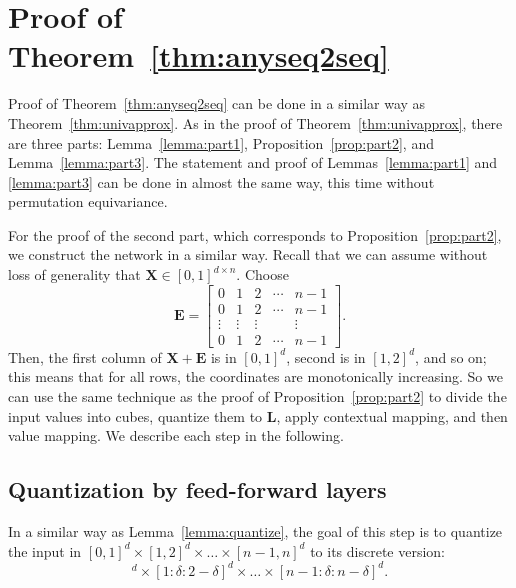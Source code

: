 \documentclass{article} %
\def\mE{{\bm{E}}}
\def\mL{{\bm{L}}}
\def\mX{{\bm{X}}}
\begin{document}

\section{Proof of Theorem~\ref{thm:anyseq2seq}}\label{sec:proof_anyseq2seq}
Proof of Theorem~\ref{thm:anyseq2seq} can be done in a similar way as Theorem~\ref{thm:univapprox}. As in the proof of Theorem~\ref{thm:univapprox}, there are three parts: Lemma~\ref{lemma:part1}, Proposition~\ref{prop:part2}, and Lemma~\ref{lemma:part3}. The statement and proof of Lemmas~\ref{lemma:part1} and \ref{lemma:part3} can be done in almost the same way, this time without permutation equivariance.

For the proof of the second part, which corresponds to Proposition~\ref{prop:part2}, we construct the network in a similar way.
Recall that we can assume without loss of generality that $\mX \in [0,1]^{d \times n}$. Choose
\begin{equation*}
    \mE = 
    \begin{bmatrix}
    0 & 1 & 2 & \cdots & n-1\\
    0 & 1 & 2 & \cdots & n-1\\
    \vdots & \vdots & \vdots & & \vdots\\
    0 & 1 & 2 & \cdots & n-1
    \end{bmatrix}.
\end{equation*}
Then, the first column of $\mX+\mE$ is in $[0,1]^d$, second is in $[1,2]^d$, and so on; this means that for all rows, the coordinates are monotonically increasing.
So we can use the same technique as the proof of Proposition~\ref{prop:part2} to divide the input values into cubes, quantize them to $\mL$, apply contextual mapping, and then value mapping. We describe each step in the following.


\subsection{Quantization by feed-forward layers}
In a similar way as Lemma~\ref{lemma:quantize}, the goal of this step is to quantize the input in $[0,1]^d \times [1,2]^d \times \dots \times [n-1,n]^d$ to its discrete version:
\begin{equation*}
[0:\delta:1-\delta]^d \times [1:\delta:2-\delta]^d \times \dots \times [n-1:\delta:n-\delta]^d.
\end{equation*}
\end{document}
